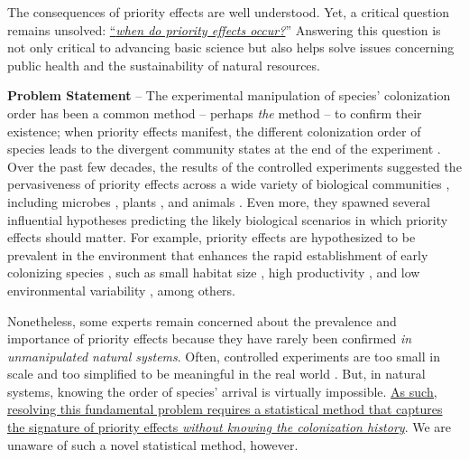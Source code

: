 \documentclass[12pt, class=article, crop=false]{standalone}
\begin{document}
The consequences of priority effects are well understood.
Yet, a critical question remains unsolved: \ul{``\textit{when do priority effects occur?}}'' 
Answering this question is not only critical to advancing basic science but also helps solve issues concerning public health and the sustainability of natural resources.

\textbf{Problem Statement} --
The experimental manipulation of species' colonization order has been a common method -- perhaps \textit{the} method -- to confirm their existence; when priority effects manifest, the different colonization order of species leads to the divergent community states at the end of the experiment \citep{fukami_historical_2015, weidlich_priority_2021}.
Over the past few decades, the results of the controlled experiments suggested the pervasiveness of priority effects across a wide variety of biological communities \citep{fukami_historical_2015, weidlich_priority_2021}, including microbes \citep{fukami_productivity-biodiversity_2003, fukami_assembly_2004, jiang_community_2008, tucker_environmental_2014, ojima_interactive_2017, hsu_metabolic_2021}, plants \citep{mason_arrival_2013, young_introduced_2017, weidlich_priority_2018, wohlwend_long-term_2019}, and animals \citep{louette_predation_2007, viana_disentangling_2016, symons_timing_2014}.
Even more, they spawned several influential hypotheses predicting the likely biological scenarios in which priority effects should matter.
For example, priority effects are hypothesized to be prevalent in the environment that enhances the rapid establishment of early colonizing species \citep{fukami_historical_2015}, such as small habitat size \citep{fukami_assembly_2004}, high productivity \citep{chase_stochastic_2010}, and low environmental variability \citep{tucker_environmental_2014}, among others.

Nonetheless, some experts remain concerned about the prevalence and importance of priority effects because they have rarely been confirmed \textit{in unmanipulated natural systems}.
Often, controlled experiments are too small in scale and too simplified to be meaningful in the real world \citep{weidlich_priority_2021}.
But, in natural systems, knowing the order of species' arrival is virtually impossible.
\ul{As such, resolving this fundamental problem requires a statistical method that captures the signature of priority effects \textit{without knowing the colonization history}}.
We are unaware of such a novel statistical method, however. 
\end{document}
